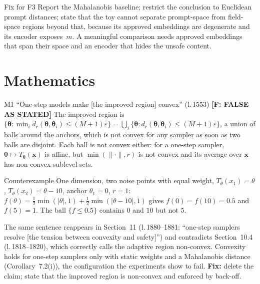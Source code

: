 \documentclass[11pt]{article}
\newcommand{\bth}{\boldsymbol{\theta}}
\newcommand{\bx}{\mathbf{x}}
\newcommand{\lin}[1]{l.\,#1}
\newcommand{\badge}[2]{\textcolor{#1}{\textbf{[#2]}}}
\newcommand{\Sfalse}{\badge{errRed}{F: FALSE AS STATED}}
\begin{document}
\begin{fixbox}{Fix for F3}
Report the Mahalanobis baseline; restrict the conclusion to Euclidean prompt distances; state that the toy cannot separate
prompt-space from field-space regions beyond that, because its approved embeddings are degenerate and its encoder exposes~$m$.
A meaningful comparison needs approved embeddings that span their space and an encoder that hides the unsafe content.
\end{fixbox}

\section{Mathematics}\label{sec:maths}

\begin{findbox}{M1 \quad ``One-step models make [the improved region] convex'' (\lin{1553}) \hfill \Sfalse}
The improved region is $\{\bth:\min_id_r(\bth,\bth_i)\le(M+1)\varepsilon\}=\bigcup_i\{\bth:d_r(\bth,\bth_i)\le(M+1)\varepsilon\}$, a union of
balls around the anchors, which is not convex for any sampler as soon as two balls are disjoint. Each ball is not convex either:
for a one-step sampler, $\bth\mapsto T_{\bth}(\bx)$ is affine, but $\min(\|\cdot\|,r)$ is not convex and its average over $\bx$ has
non-convex sublevel sets.
\end{findbox}
\begin{cexbox}{Counterexample}
One dimension, two noise points with equal weight, $T_\theta(x_1)=\theta$, $T_\theta(x_2)=\theta-10$, anchor $\theta_1=0$, $r=1$:
$f(\theta)=\tfrac12\min(|\theta|,1)+\tfrac12\min(|\theta-10|,1)$ gives $f(0)=f(10)=0.5$ and $f(5)=1$. The ball $\{f\le0.5\}$ contains $0$ and
$10$ but not $5$.
\end{cexbox}
\noindent The same sentence reappears in Section~11 (\lin{1880--1881}: ``one-step samplers resolve [the tension between convexity and
safety]'') and contradicts Section~10.4 (\lin{1818--1820}), which correctly calls the adaptive region non-convex. Convexity holds
for one-step samplers only with static weights and a Mahalanobis distance (Corollary~7.2(i)), the configuration the
experiments show to fail. \textbf{Fix:} delete the claim; state that the improved region is non-convex and enforced by back-off.
\end{document}
